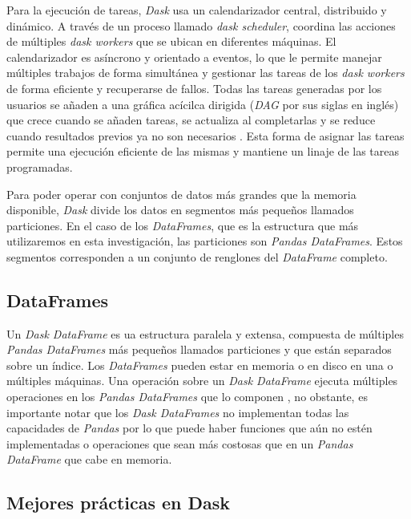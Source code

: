 Para la ejecución de tareas, \textit{Dask} usa un calendarizador central, distribuido y dinámico. A través de un proceso llamado \textit{dask scheduler}, coordina las acciones de múltiples \textit{dask workers} que se ubican en diferentes máquinas. El calendarizador es asíncrono y orientado a eventos, lo que le permite manejar múltiples trabajos de forma simultánea y gestionar las tareas de los \textit{dask workers} de forma eficiente y recuperarse de fallos. Todas las tareas generadas por los usuarios se añaden a una gráfica acícilca dirigida (\textit{DAG} por sus siglas en inglés) que crece cuando se añaden tareas, se actualiza al completarlas y se reduce cuando resultados previos ya no son necesarios \cite{daskdistributed}. Esta forma de asignar las tareas permite una ejecución eficiente de las mismas y mantiene un linaje de las tareas programadas.

Para poder operar con conjuntos de datos más grandes que la memoria disponible, \textit{Dask} divide los datos en segmentos más pequeños llamados particiones. En el caso de los \textit{DataFrames}, que es la estructura que más utilizaremos en esta investigación, las particiones son \textit{Pandas DataFrames}. Estos segmentos corresponden a un conjunto de renglones del \textit{DataFrame} completo.


\subsection{DataFrames}

Un \textit{Dask DataFrame} es ua estructura paralela y extensa, compuesta de múltiples \textit{Pandas DataFrames} más pequeños llamados particiones y que están separados sobre un índice. Los \textit{DataFrames} pueden estar en memoria o en disco en una o múltiples máquinas. Una operación sobre un \textit{Dask DataFrame} ejecuta múltiples operaciones en los \textit{Pandas DataFrames} que lo componen \cite{daskdataframe}, no obstante, es importante notar que los \textit{Dask DataFrames} no implementan todas las capacidades de \textit{Pandas} por lo que puede haber funciones que aún no estén implementadas o operaciones que sean más costosas que en un \textit{Pandas DataFrame} que cabe en memoria.


\subsection{Mejores prácticas en Dask}

